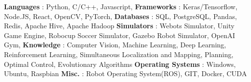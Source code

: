 \begin{cventries}  
\skillentry
    {
    \space \textbf{Languages} : Python, C/C++, Javascript, 
    \space \textbf{Frameworks} : Keras/Tensorflow, Node.JS, React, OpenCV, PyTorch, 
    \space \textbf{Databases} : SQL, PostgreSQL, Pandas, Redis, Apache Hive, Apache Hadoop
    \space \textbf{Simulators} : Webots Simulator, Unity Game Engine, Robocup Soccer Simulator, Gazebo Robot Simulator, OpenAI Gym,
    \space \textbf{Knowledge} : Computer Vision, Machine Learning, Deep Learning, Reinforcement Learning, Simultaneous Localization and Mapping, Planning, Optimal Control, Evolutionary Algorithms
    \space \textbf{Operating Systems} : Windows, Ubuntu, Raspbian 
    \space \textbf{Misc.} : Robot Operating System(ROS), GIT, Docker, CUDA
    }
    

\end{cventries}
\vspace{0.5 cm}